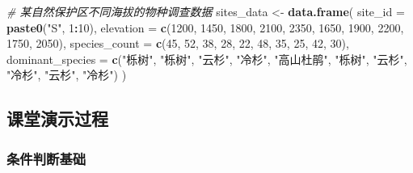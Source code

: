 \documentclass[
  twoside]{book}
\newenvironment{Shaded}{\begin{snugshade}}{\end{snugshade}}
\newcommand{\AttributeTok}[1]{\textcolor[rgb]{0.13,0.29,0.53}{#1}}
\newcommand{\CommentTok}[1]{\textcolor[rgb]{0.56,0.35,0.01}{\textit{#1}}}
\newcommand{\DecValTok}[1]{\textcolor[rgb]{0.00,0.00,0.81}{#1}}
\newcommand{\FunctionTok}[1]{\textcolor[rgb]{0.13,0.29,0.53}{\textbf{#1}}}
\newcommand{\NormalTok}[1]{#1}
\newcommand{\OtherTok}[1]{\textcolor[rgb]{0.56,0.35,0.01}{#1}}
\newcommand{\SpecialCharTok}[1]{\textcolor[rgb]{0.81,0.36,0.00}{\textbf{#1}}}
\newcommand{\StringTok}[1]{\textcolor[rgb]{0.31,0.60,0.02}{#1}}
\begin{document}
\begin{Shaded}
\begin{Highlighting}[]
\CommentTok{\# 某自然保护区不同海拔的物种调查数据}
\NormalTok{sites\_data }\OtherTok{\textless{}{-}} \FunctionTok{data.frame}\NormalTok{(}
  \AttributeTok{site\_id =} \FunctionTok{paste0}\NormalTok{(}\StringTok{"S"}\NormalTok{, }\DecValTok{1}\SpecialCharTok{:}\DecValTok{10}\NormalTok{),}
  \AttributeTok{elevation =} \FunctionTok{c}\NormalTok{(}\DecValTok{1200}\NormalTok{, }\DecValTok{1450}\NormalTok{, }\DecValTok{1800}\NormalTok{, }\DecValTok{2100}\NormalTok{, }\DecValTok{2350}\NormalTok{, }\DecValTok{1650}\NormalTok{, }\DecValTok{1900}\NormalTok{, }\DecValTok{2200}\NormalTok{, }\DecValTok{1750}\NormalTok{, }\DecValTok{2050}\NormalTok{),}
  \AttributeTok{species\_count =} \FunctionTok{c}\NormalTok{(}\DecValTok{45}\NormalTok{, }\DecValTok{52}\NormalTok{, }\DecValTok{38}\NormalTok{, }\DecValTok{28}\NormalTok{, }\DecValTok{22}\NormalTok{, }\DecValTok{48}\NormalTok{, }\DecValTok{35}\NormalTok{, }\DecValTok{25}\NormalTok{, }\DecValTok{42}\NormalTok{, }\DecValTok{30}\NormalTok{),}
  \AttributeTok{dominant\_species =} \FunctionTok{c}\NormalTok{(}\StringTok{"栎树"}\NormalTok{, }\StringTok{"栎树"}\NormalTok{, }\StringTok{"云杉"}\NormalTok{, }\StringTok{"冷杉"}\NormalTok{, }\StringTok{"高山杜鹃"}\NormalTok{, }\StringTok{"栎树"}\NormalTok{, }\StringTok{"云杉"}\NormalTok{, }\StringTok{"冷杉"}\NormalTok{, }\StringTok{"云杉"}\NormalTok{, }\StringTok{"冷杉"}\NormalTok{)}
\NormalTok{)}
\end{Highlighting}
\end{Shaded}

\hypertarget{ux8bfeux5802ux6f14ux793aux8fc7ux7a0b-7}{%
\subsection{课堂演示过程}\label{ux8bfeux5802ux6f14ux793aux8fc7ux7a0b-7}}

\hypertarget{ux6761ux4ef6ux5224ux65adux57faux7840}{%
\subsubsection{条件判断基础}\label{ux6761ux4ef6ux5224ux65adux57faux7840}}
\end{document}
